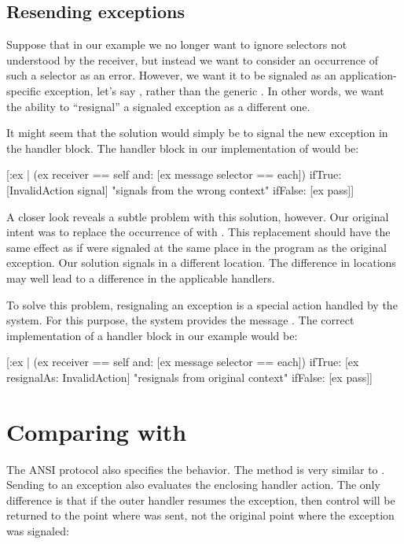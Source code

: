 \subsection{Resending exceptions}

Suppose that in our  example we no longer want to ignore selectors not understood by the receiver, but instead we want to consider an occurrence of such a selector as an error. However, we want it to be signaled as an application-specific exception, let's say , rather than the generic . In other words, we want the ability to ``resignal'' a signaled exception as a different one.

It might seem that the solution would simply be to signal the new exception in the handler block. The handler block in our implementation of  would be:

\begin{code}{}
[:ex | (ex receiver == self and: [ex message selector == each])
	ifTrue: [InvalidAction signal]    "signals from the wrong context"
	ifFalse: [ex pass]]
\end{code}

A closer look reveals a subtle problem with this solution, however. Our original intent was to replace the occurrence of  with . This replacement should have the same effect as if  were signaled at the same place in the program as the original  exception. Our solution signals  in a different location. The difference in locations may well lead to a difference in the applicable handlers.

To solve this problem, resignaling an exception is a special action handled by the system. For this purpose, the system provides the message . The correct implementation of a handler block in our  example would be:

\begin{code}{}
 [:ex |  (ex receiver == self and: [ex message selector == each])
	ifTrue: [ex resignalAs: InvalidAction]    "resignals from original context"
	ifFalse: [ex pass]]
\end{code}

\section{Comparing  with }
The ANSI protocol also specifies the  behavior. The method  is very similar to . Sending  to an exception also evaluates the enclosing handler action. The only difference is that if the outer handler resumes the exception, then control will be returned to the point where  was sent, not the original point where the exception was signaled:

